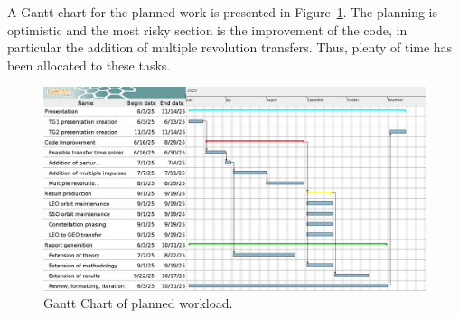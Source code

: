 A Gantt chart for the planned work is presented in Figure~\ref{fig:planning}. The planning is optimistic and the most risky section is the improvement of the code, in particular the addition of multiple revolution transfers. Thus, plenty of time has been allocated to these tasks.

\begin{figure}[htbp]
    \centering
    \includegraphics[width=\textwidth]{img/TG planning.png}
    \caption{Gantt Chart of planned workload.}
    \label{fig:planning}
\end{figure}